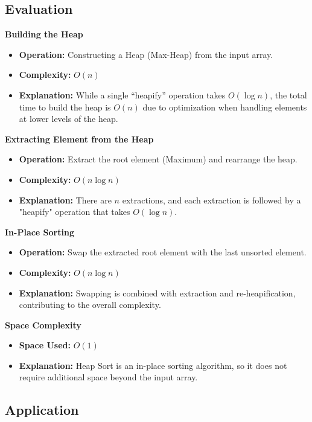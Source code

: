 

\subsection{Evaluation}

\textbf{Building the Heap}
\begin{itemize}
    \item \textbf{Operation:} Constructing a Heap (Max-Heap) from the input array.
    \item \textbf{Complexity:} $O(n)$
    \item \textbf{Explanation:} While a single “heapify” operation takes $O(\log n)$, the total time to build the heap is $O(n)$ due to optimization when handling elements at lower levels of the heap.
\end{itemize}

\textbf{Extracting Element from the Heap}
\begin{itemize}
    \item \textbf{Operation:} Extract the root element (Maximum) and rearrange the heap.
    \item \textbf{Complexity:} $O(n \log n)$
    \item \textbf{Explanation:} There are $n$ extractions, and each extraction is followed by a "heapify" operation that takes $O(\log n)$.
\end{itemize}

\textbf{In-Place Sorting}
\begin{itemize}
    \item \textbf{Operation:} Swap the extracted root element with the last unsorted element.
    \item \textbf{Complexity:} $O(n \log n)$
    \item \textbf{Explanation:} Swapping is combined with extraction and re-heapification, contributing to the overall complexity.
\end{itemize}

\textbf{Space Complexity}
\begin{itemize}
    \item \textbf{Space Used:} $O(1)$
    \item \textbf{Explanation:} Heap Sort is an in-place sorting algorithm, so it does not require additional space beyond the input array.
\end{itemize}

\subsection{Application}

